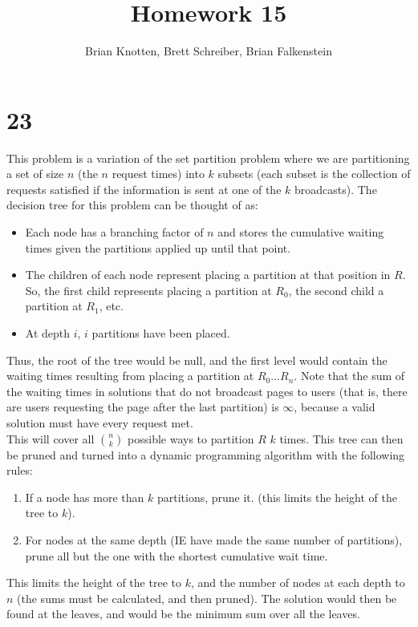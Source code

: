 \documentclass[letterpaper,notitlepage,twoside]{article}
\begin{document}
\title{Homework 15}
\author{Brian Knotten, Brett Schreiber, Brian Falkenstein}
\maketitle

\section*{23}
This problem is a variation of the set partition problem where we are partitioning a set of size $n$ (the $n$ request times) into $k$ subsets (each subset is the collection of requests satisfied if the information is sent at one of the $k$ broadcasts). The decision tree for this problem can be thought of as:
\begin{itemize}
\item Each node has a branching factor of $n$ and stores the cumulative waiting times given the partitions applied up until that point.
\item The children of each node represent placing a partition at that position in $R$. So, the first child represents placing a partition at $R_0$, the second child a partition at $R_1$, etc. 
\item At depth $i$, $i$ partitions have been placed. 
\end{itemize}
Thus, the root of the tree would be null, and the first level would contain the waiting times resulting from placing a partition at $R_0...R_n$. Note that the sum of the waiting times in solutions that do not broadcast pages to users (that is, there are users requesting the page after the last partition) is $\infty$, because a valid solution must have every request met.\\
This will cover all $\binom{n}{k}$ possible ways to partition $R$ $k$ times. This tree can then be pruned and turned into a dynamic programming algorithm with the following rules:
\begin{enumerate}
\item If a node has more than $k$ partitions, prune it. (this limits the height of the tree to $k$).
\item For nodes at the same depth (IE have made the same number of partitions), prune all but the one with the shortest cumulative wait time. 
\end{enumerate}
This limits the height of the tree to $k$, and the number of nodes at each depth to $n$ (the sums must be calculated, and then pruned). The solution would then be found at the leaves, and would be the minimum sum over all the leaves. \\
\end{document}
